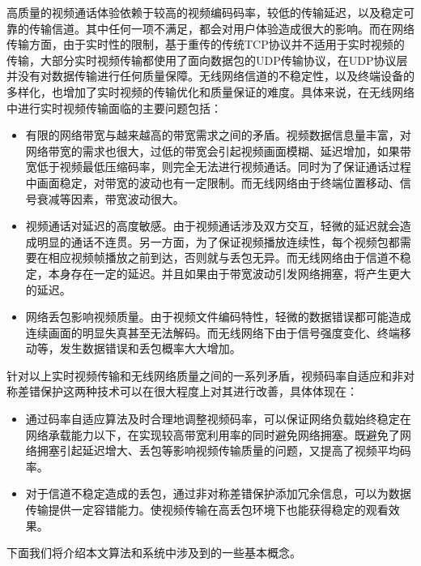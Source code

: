 高质量的视频通话体验依赖于较高的视频编码码率，较低的传输延迟，以及稳定可靠的传输信道。其中任何一项不满足，都会对用户体验造成很大的影响。而在网络传输方面，由于实时性的限制，基于重传的传统TCP协议并不适用于实时视频的传输，大部分实时视频传输都使用了面向数据包的UDP传输协议，在UDP协议层并没有对数据传输进行任何质量保障。无线网络信道的不稳定性，以及终端设备的多样化，也增加了实时视频的传输优化和质量保证的难度。具体来说，在无线网络中进行实时视频传输面临的主要问题包括：

\begin{itemize}
    \item 有限的网络带宽与越来越高的带宽需求之间的矛盾。视频数据信息量丰富，对网络带宽的需求也很大，过低的带宽会引起视频画面模糊、延迟增加，如果带宽低于视频最低压缩码率，则完全无法进行视频通话。同时为了保证通话过程中画面稳定，对带宽的波动也有一定限制。而无线网络由于终端位置移动、信号衰减等因素，带宽波动很大。
    \item 视频通话对延迟的高度敏感。由于视频通话涉及双方交互，轻微的延迟就会造成明显的通话不连贯。另一方面，为了保证视频播放连续性，每个视频包都需要在相应视频帧播放之前到达，否则就与丢包无异。而无线网络由于信道不稳定，本身存在一定的延迟。并且如果由于带宽波动引发网络拥塞，将产生更大的延迟。
    \item 网络丢包影响视频质量。由于视频文件编码特性，轻微的数据错误都可能造成连续画面的明显失真甚至无法解码。而无线网络下由于信号强度变化、终端移动等，发生数据错误和丢包概率大大增加。
\end{itemize}

针对以上实时视频传输和无线网络质量之间的一系列矛盾，视频码率自适应和非对称差错保护这两种技术可以在很大程度上对其进行改善，具体体现在：

\begin{itemize}
    \item 通过码率自适应算法及时合理地调整视频码率，可以保证网络负载始终稳定在网络承载能力以下，在实现较高带宽利用率的同时避免网络拥塞。既避免了网络拥塞引起延迟增大、丢包等影响视频传输质量的问题，又提高了视频平均码率。
    \item 对于信道不稳定造成的丢包，通过非对称差错保护添加冗余信息，可以为数据传输提供一定容错能力。使视频传输在高丢包环境下也能获得稳定的观看效果。
\end{itemize}

下面我们将介绍本文算法和系统中涉及到的一些基本概念。

